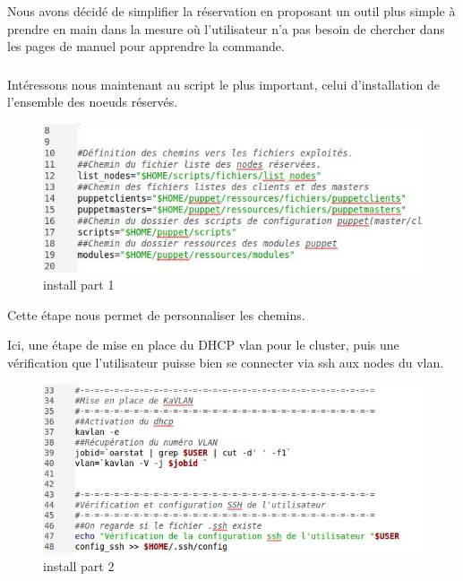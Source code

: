 \documentclass[a4paper, 10pt, onecolumn]{report}
\begin{document}
Nous avons décidé de simplifier la réservation en proposant un outil plus simple à prendre en
main dans la mesure où l’utilisateur n’a pas besoin de chercher dans les pages de manuel pour
apprendre la commande.

\subsubsection{}

Intéressons nous maintenant au script le plus important, celui d’installation de l’ensemble des noeuds
réservés. 

\begin{figure}[htb]
\begin{center}
\includegraphics[scale=0.550]{images/install_1}
\caption{install part 1}
\end{center}
\end{figure}

Cette étape nous permet de personnaliser les chemins.

\newpage
Ici, une étape de mise en place du DHCP vlan pour le cluster, puis une vérification que l’utilisateur puisse 
bien se connecter via ssh aux nodes du vlan.

\begin{figure}[htb]
\begin{center}
\includegraphics[scale=0.550]{images/install_2}
\caption{install part 2}
\end{center}
\end{figure}
\end{document}
